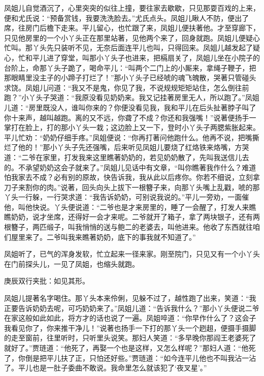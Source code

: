 \begin{parag}


    凤姐儿自觉酒沉了，心里突突的似往上撞，要往家去歇歇，只见那耍百戏的上来，便和尤氏说：“预备赏钱，我要洗洗脸去。”尤氏点头。凤姐儿瞅人不防，便出了席，往房门后檐下走来。平儿留心，也忙跟了来，凤姐儿便扶著他。才至穿廊下，只见他房里的一个小丫头正在那里站著，见他两个来了，回身就跑。凤姐儿便疑心忙叫。那丫头先只装听不见，无奈后面连平儿也叫，只得回来。凤姐儿越发起了疑心，忙和平儿进了穿堂，叫那小丫头子也进来，把槅扇关了，凤姐儿坐在小院子的台阶上，命那丫头子跪了，喝命平儿：“叫两个二门上的小厮来，拿绳子鞭子，把那眼睛里没主子的小蹄子打烂了！”那小丫头子已经唬的魂飞魄散，哭著只管碰头求饶。凤姐儿问道：“我又不是鬼，你见了我，不说规规矩矩站住，怎么倒往前跑？”小丫头子哭道：“我原没看见奶奶来。我又记挂著房里无人，所以跑了。”凤姐儿道：“房里既没人，谁叫你来的？你便没看见我，我和平儿在后头扯著脖子叫了你十来声，越叫越跑。离的又不远，你聋了不成？你还和我强嘴！”说著便扬手一掌打在脸上，打的那小丫头一栽；这边脸上又一下，登时小丫头子两腮紫胀起来。平儿忙劝：“奶奶仔细手疼。”凤姐便说：“你再打著问他跑什么。他再不说，把嘴撕烂了他的！”那小丫头子先还强嘴，后来听见凤姐儿要烧了红烙铁来烙嘴，方哭道：“二爷在家里，打发我来这里瞧著奶奶的，若见奶奶散了，先叫我送信儿去的。不承望奶奶这会子就来了。”凤姐儿见话中有文章，“叫你瞧著我作什么？难道怕我家去不成？必有别的原故，快告诉我，我从此以后疼你。你若不细说，立刻拿刀子来割你的肉。”说著，回头向头上拔下一根簪子来，向那丫头嘴上乱戳，唬的那丫头一行躲，一行哭求道：“我告诉奶奶，可别说我说的。”平儿一旁劝，一面催他，叫他快说。丫头便说道：“二爷也是才来房里的，睡了一会醒了，打发人来瞧瞧奶奶，说才坐席，还得好一会才来呢。二爷就开了箱子，拿了两块银子，还有两根簪子，两匹缎子，叫我悄悄的送与鲍二的老婆去，叫他进来。他收了东西就往咱们屋里来了。二爷叫我来瞧著奶奶，底下的事我就不知道了。”
\end{parag}


\begin{parag}


    凤姐听了，已气的浑身发软，忙立起来一径来家。刚至院门，只见又有一个小丫头在门前探头儿，一见了凤姐，也缩头就跑。\begin{note}庚辰双行夹批：如见其形。\end{note}凤姐儿提著名字喝住。那丫头本来伶俐，见躲不过了，越性跑了出来，笑道：“我正要告诉奶奶去呢，可巧奶奶来了。”凤姐儿道：“告诉我什么？”那小丫头便说二爷在家这般如此如此，将方才的话也说了一遍。凤姐啐道：“你早作什么了？这会子我看见你了，你来推干净儿！”说著也扬手一下打的那丫头一个趔趄，便摄手摄脚的走至窗前，往里听时，只听里头说笑。那妇人笑道：“多早晚你那阎王老婆死了就好了。”贾琏道：“他死了，再娶一个也是这样，又怎么样呢？”那妇人道：“他死了，你倒是把平儿扶了正，只怕还好些。”贾琏道：“如今连平儿他也不叫我沾一沾了。平儿也是一肚子委曲不敢说。我命里怎么就该犯了‘夜叉星’。”
\end{parag}



